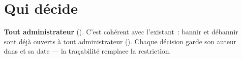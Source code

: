 \section{Qui décide}

\textbf{Tout administrateur} (). C'est cohérent avec l'existant~:
bannir et débannir sont déjà ouverts à tout administrateur
(). Chaque décision garde son auteur dans  et
sa date --- la traçabilité remplace la restriction.
